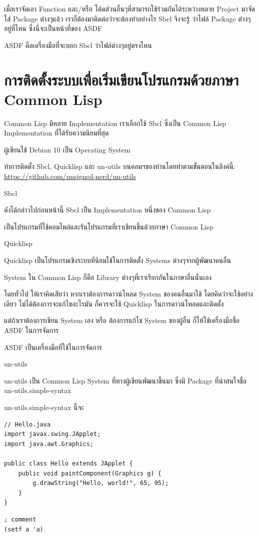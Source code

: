 \documentclass[a4paper]{article}
\begin{document}
เมื่อเราจัดเอา Function และ/หรือ โค้ดส่วนอื่นๆที่สามารถใช้ร่วมกันได้ระหว่างหลาย
Project มาจัดใส่ Package ต่างๆแล้ว เราก็ต้องมาคิดต่อว่าจะต้องทำอย่างไร Sbcl จึงจะรู้%
ว่าไฟล์ Package ต่างๆอยู่ที่ไหน ซึ่งนี่จะเป็นหน้าที่ของ ASDF

ASDF คือเครื่องมือที่จะบอก Sbcl ว่าไฟล์ต่างๆอยู่ตรงไหน


\section{การติดตั้งระบบเพื่อเริ่มเขียนโปรแกรมด้วยภาษา Common Lisp}

Common Lisp มีหลาย Implementation เราเลือกใช้ Sbcl ซึ่งเป็น Common Lisp Implementation ที่ได้รับความนิยมที่สุด

ผู้เขียนใช้ Debian 10 เป็น Operating System

ทำการติดตั้ง Sbcl, Quicklisp และ un-utils บนคอมฯของท่านโดยทำตามขั้นตอนในลิงค์นี้:
\href{https://github.com/unsigned-nerd/un-utils}{https://github.com/unsigned-nerd/un-utils}

Sbcl

ดังได้กล่าวไปก่อนหน้านี้ Sbcl เป็น Implementation หนึ่งของ Common Lisp

เป็นโปรแกรมที่ใช้คอมไพล์และรันโปรแกรมที่เราเขียนขึ้นด้วยภาษา Common Lisp

Quicklisp

Quicklisp เป็นโปรแกรมเชิงระบบที่นิยมใช้ในการติดตั้ง Systems ต่างๆจากผู้พัฒนาคนอื่น

System ใน Common Lisp ก็คือ Library ต่างๆที่เราเรียกกันในภาษาอื่นนั่นเอง

โดยทั่วไป ให้เราคิดเสียว่า หากเราต้องการดาวน์โหลด System ของคนอื่นมาใช้
โดยคิดว่าจะใช้อย่างเดียว ไม่ได้ต้องการจะแก้ไขอะไรมัน ก็ควรจะใช้ Quicklisp
ในการดาวน์โหลดและติดตั้ง

แต่ถ้าเราต้องการเขียน System เอง หรือ ต้องการแก้ไข System ของผู้อื่น ก็ให้ใช้เครื่องมือชื่อ
ASDF ในการจัดการ

ASDF เป็นเครื่องมือที่ใช้ในการจัดการ

un-utils

un-utils เป็น Common Lisp System ที่ทางผู้เขียนพัฒนาขึ้นมา ซึ่งมี Package ที่น่าสนใจชื่อ
un-utils.simple-syntax

un-utils.simple-syntax นี้จะ

\lstset{language=Java}
\begin{lstlisting}
// Hello.java
import javax.swing.JApplet;
import java.awt.Graphics;

public class Hello extends JApplet {
    public void paintComponent(Graphics g) {
        g.drawString("Hello, world!", 65, 95);
    }    
}
\end{lstlisting}

\lstset{language=Lisp}
\begin{lstlisting}
; comment
(setf a 'a)
\end{lstlisting}
\end{document}
